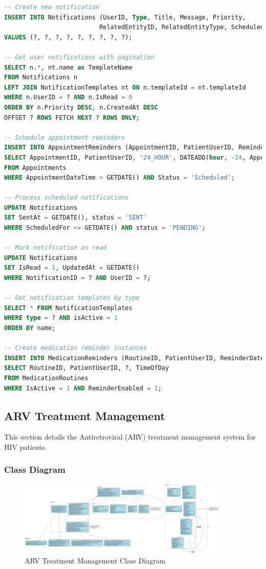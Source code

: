 \documentclass[12pt,a4paper]{article}
\begin{document}
\begin{lstlisting}[language=SQL, caption=Notification Management Queries]
-- Create new notification
INSERT INTO Notifications (UserID, Type, Title, Message, Priority, 
                          RelatedEntityID, RelatedEntityType, ScheduledFor, templateId)
VALUES (?, ?, ?, ?, ?, ?, ?, ?, ?);

-- Get user notifications with pagination
SELECT n.*, nt.name as TemplateName 
FROM Notifications n
LEFT JOIN NotificationTemplates nt ON n.templateId = nt.templateId
WHERE n.UserID = ? AND n.IsRead = 0
ORDER BY n.Priority DESC, n.CreatedAt DESC
OFFSET ? ROWS FETCH NEXT ? ROWS ONLY;

-- Schedule appointment reminders
INSERT INTO AppointmentReminders (AppointmentID, PatientUserID, ReminderType, ReminderDateTime)
SELECT AppointmentID, PatientUserID, '24_HOUR', DATEADD(hour, -24, AppointmentDateTime)
FROM Appointments 
WHERE AppointmentDateTime > GETDATE() AND Status = 'Scheduled';

-- Process scheduled notifications
UPDATE Notifications 
SET SentAt = GETDATE(), status = 'SENT'
WHERE ScheduledFor <= GETDATE() AND status = 'PENDING';

-- Mark notification as read
UPDATE Notifications 
SET IsRead = 1, UpdatedAt = GETDATE()
WHERE NotificationID = ? AND UserID = ?;

-- Get notification templates by type
SELECT * FROM NotificationTemplates 
WHERE type = ? AND isActive = 1 
ORDER BY name;

-- Create medication reminder instances
INSERT INTO MedicationReminders (RoutineID, PatientUserID, ReminderDate, ReminderTime)
SELECT RoutineID, PatientUserID, ?, TimeOfDay
FROM MedicationRoutines 
WHERE IsActive = 1 AND ReminderEnabled = 1;
\end{lstlisting}

\subsection{ARV Treatment Management}

This section details the Antiretroviral (ARV) treatment management system for HIV patients.

\subsubsection{Class Diagram}

\begin{figure}[H]
\centering
\includegraphics[width=0.9\textwidth]{diagrams/arv_treatment_class_diagram.svg}
\caption{ARV Treatment Management Class Diagram}
\label{fig:arv-class-diagram}
\end{figure}
\end{document}
